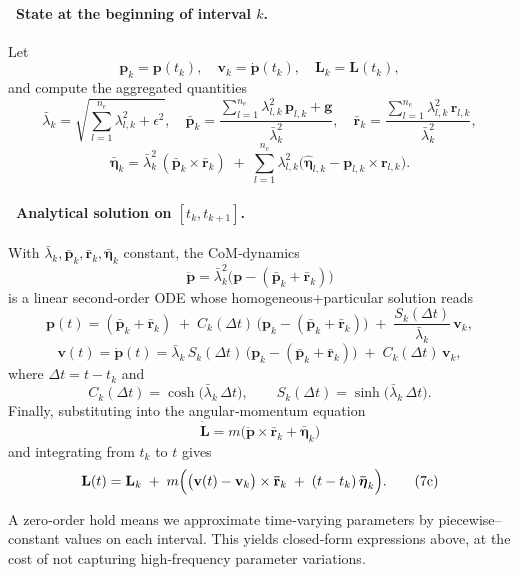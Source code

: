 \documentclass[main.tex]{subfiles}
\begin{document}
\begin{sloppypar}
\paragraph{\ State at the beginning of interval $k$.}
Let
\[
\mathbf{p}_k = \mathbf{p}(t_k),\quad
\mathbf{v}_k = \dot{\mathbf{p}}(t_k),\quad
\mathbf{L}_k = \mathbf{L}(t_k),
\]
and compute the aggregated quantities
\[
\bar\lambda_k
=\sqrt{\sum_{l=1}^{n_e}\lambda_{l,k}^2+\epsilon^2},\quad
\mathbf{\bar{p}}_k
=\frac{\sum_{l=1}^{n_e}\lambda_{l,k}^2\,\mathbf{p}_{l,k}+\mathbf{g}}{\bar\lambda_k^2},\quad
\mathbf{\bar{r}}_k
=\frac{\sum_{l=1}^{n_e}\lambda_{l,k}^2\,\mathbf{r}_{l,k}}{\bar\lambda_k^2},
\]
\[
\mathbf{\bar{\boldsymbol{\eta}}}_k
=\bar\lambda_k^2\,(\mathbf{\bar{p}}_k\times\mathbf{\bar{r}}_k)
\;+\;\sum_{l=1}^{n_e}\lambda_{l,k}^2\bigl(\mathbf{\hat{\boldsymbol{\eta}}}_{l,k}-\mathbf{p}_{l,k}\times \mathbf{r}_{l,k}\bigr).
\]

\paragraph{\ Analytical solution on $[t_k,t_{k+1}]$.}
With $\bar\lambda_k,\mathbf{\bar{p}}_k,\mathbf{\bar{r}}_k,\mathbf{\bar{\boldsymbol{\eta}}}_k$ constant, the CoM‐dynamics 
\[
\ddot{\mathbf{p}} = \bar\lambda_k^2\bigl(\mathbf{p} -(\mathbf{\bar{p}}_k+\mathbf{\bar{r}}_k)\bigr)
\]
is a linear second‐order ODE whose homogeneous+particular solution reads
\[
\mathbf{p}(t)
= (\mathbf{\bar{p}}_k+\mathbf{\bar{r}}_k)
\;+\;C_k(\Delta t)\,\bigl(\mathbf{p}_k -(\mathbf{\bar{p}}_k+\mathbf{\bar{r}}_k)\bigr)
\;+\;\frac{S_k(\Delta t)}{\bar\lambda_k}\,\mathbf{v}_k,
\tag{7a}
\]
\[
\mathbf{v}(t)
=\dot{\mathbf{p}}(t)
=\bar\lambda_k\,S_k(\Delta t)\,\bigl(\mathbf{p}_k -(\mathbf{\bar{p}}_k+\mathbf{\bar{r}}_k)\bigr)
\;+\;C_k(\Delta t)\,\mathbf{v}_k,
\tag{7b}
\]
where $\Delta t = t - t_k$ and
\[
C_k(\Delta t) = \cosh\bigl(\bar\lambda_k\,\Delta t\bigr),\qquad
S_k(\Delta t) = \sinh\bigl(\bar\lambda_k\,\Delta t\bigr).
\]
Finally, substituting into the angular‐momentum equation
\[
\dot{\mathbf{L}} = m\bigl(\ddot{\mathbf{p}}\times \mathbf{\bar{r}}_k + \mathbf{\bar{\boldsymbol{\eta}}}_k\bigr)
\]
and integrating from $t_k$ to $t$ gives
\[
\mathbf{L}(t)
= \mathbf{L}_k
\;+\;m\Bigl(\bigl(\mathbf{v}(t)-\mathbf{v}_k\bigr)\times \mathbf{\bar{r}}_k
   \;+\;(t-t_k)\,\mathbf{\bar{\boldsymbol{\eta}}}_k\Bigr).
\tag{7c}
\]

\medskip
\begin{remark}
A zero‐order hold means we approximate time‐varying parameters by piecewise–constant values on each interval.  This yields closed‐form expressions above, at the cost of not capturing high‐frequency parameter variations.
\end{remark}


\end{sloppypar}
\end{document}

